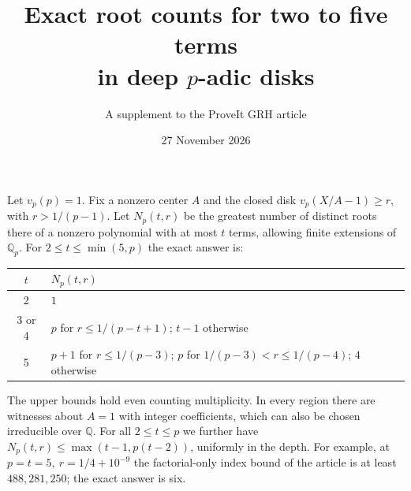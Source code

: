 \documentclass[11pt]{article}
\title{\vspace{-1.6em}Exact root counts for two to five terms\\ in deep \(p\)-adic disks}
\author{A supplement to the ProveIt GRH article}
\date{27 November 2026}
\begin{document}
\maketitle
Let \(v_p(p)=1\). Fix a nonzero center \(A\) and the closed disk
\(v_p(X/A-1)\ge r\), with \(r>1/(p-1)\). Let \(N_p(t,r)\) be the greatest
number of distinct roots there of a nonzero polynomial with at most
\(t\) terms, allowing finite extensions of \(\mathbb Q_p\).
For \(2\le t\le \min(5,p)\) the exact answer is:
\begin{center}
\begin{tabular}{cl}
\toprule
\(t\) & \(N_p(t,r)\)\\
\midrule
2 & \(1\)\\
3 or 4 & \(p\) for \(r\le1/(p-t+1)\); \(t-1\) otherwise\\
5 & \(p+1\) for \(r\le1/(p-3)\);
 \(p\) for \(1/(p-3)<r\le1/(p-4)\); \(4\) otherwise\\
\bottomrule
\end{tabular}
\end{center}
The upper bounds hold even counting multiplicity. In every region
there are witnesses about \(A=1\) with integer coefficients,
which can also be chosen irreducible over \(\mathbb Q\).
For all \(2\le t\le p\) we further have
\(N_p(t,r)\le\max(t-1,p(t-2))\), uniformly in the depth.
For example, at \(p=t=5,\ r=1/4+10^{-9}\) the
factorial-only index bound of the article is at least \(488{,}281{,}250\);
the exact answer is six.
\end{document}
